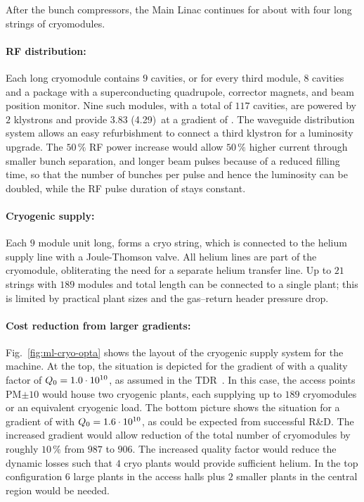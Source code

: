 After the bunch compressors, the Main Linac continues for about  with four long strings of cryomodules. 

\paragraph{RF distribution:}

Each  long cryomodule contains $9$ cavities, or for every third module, $8$ cavities and a package with a superconducting quadrupole, corrector magnets, and beam position monitor.
Nine such modules, with a total of $117$ cavities, are powered by $2$ klystrons and provide 3.83 (4.29)~\GeV at a gradient of .
The waveguide distribution system allows an easy refurbishment to connect a third klystron for a luminosity upgrade.
The $50\,\%$ RF power increase would allow $50\,\%$ higher current through smaller bunch separation, and longer beam pulses because of a reduced filling time, so that the number of bunches per pulse and hence the luminosity can be doubled, while the RF pulse duration of  stays constant.

\paragraph{Cryogenic supply:}


Each $9$ module unit  long, forms a cryo string, which is connected to the helium supply line with a Joule-Thomson valve.
All helium lines are part of the cryomodule, obliterating the need for a separate helium transfer line. 
Up to $21$ strings with $189$ modules and  total length can be connected to a single plant; 
this is limited by practical plant sizes and the gas--return header pressure drop.  


\paragraph{Cost reduction from larger gradients:}

Fig.~\ref{fig:ml-cryo-opta} shows the layout of the cryogenic supply system for the  machine.
At the top, the situation is depicted for the gradient of  with a quality factor of $Q_{\mathrm{0}}=1.0\cdot 10^{10}$, as assumed in the TDR~\cite{Adolphsen:2013kya}. 
In this case, the access points PM$\pm 10$ would house two cryogenic plants, each supplying up to $189$ cryomodules or an equivalent cryogenic load.
The bottom picture shows the situation for a gradient of  with $Q_{\mathrm{0}}=1.6\cdot 10^{10}$, as could be expected from successful R\&D. 
The increased gradient would  allow reduction of the total number of cryomodules by roughly $10\,\%$ from $987$ to $906$. The increased quality factor would reduce the dynamic losses such that $4$ cryo plants would provide sufficient helium. In the top configuration $6$ large plants in the access halls plus $2$ smaller plants in the central region would be needed.

